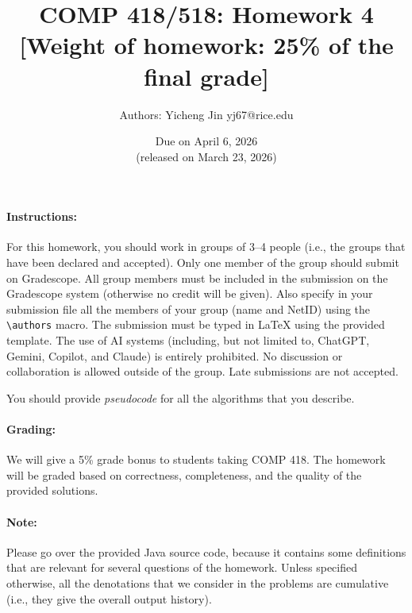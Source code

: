 \documentclass[11pt]{article}
\theoremstyle{definition}
\begin{document}
\title{COMP 418/518: Homework 4 \\[1ex] \large [Weight of homework: 25\% of the final grade]}
\author{Authors: Yicheng Jin yj67@rice.edu}
\date{Due on April 6, 2026 \\ \small (released on March 23, 2026)}

\maketitle

\paragraph{Instructions:}

For this homework, you should work in groups of 3--4 people (i.e., the groups that have been declared and accepted).
%
Only one member of the group should submit on Gradescope.
%
All group members must be included in the submission on the Gradescope system (otherwise no credit will be given).
%
Also specify in your submission file all the members of your group (name and NetID) using the \texttt{\textbackslash authors} macro.
%
The submission must be typed in LaTeX using the provided template.
%
The use of AI systems (including, but not limited to, ChatGPT, Gemini, Copilot, and Claude) is entirely prohibited.
%
No discussion or collaboration is allowed outside of the group.
%
Late submissions are not accepted.

\begin{center}
	You should provide \emph{pseudocode} for all the algorithms that you describe.
\end{center}

\paragraph{Grading:}

We will give a 5\% grade bonus to students taking COMP 418. The homework will be graded based on correctness, completeness, and the quality of the provided solutions.

\paragraph{Note:}

Please go over the provided Java source code, because it contains some definitions that are relevant for several questions of the homework. Unless specified otherwise, all the denotations that we consider in the problems are cumulative (i.e., they give the overall output history).
\end{document}
